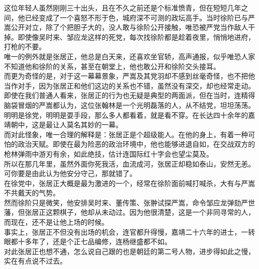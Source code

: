 \begin{multicols}{\theparacolNo}
这位年轻人虽然刚刚三十出头，且在不久之前还是个标准愤青，但在短短几年之间，他已经变成了一个喜怒不形于色，城府深不可测的政坛高手。当时徐阶已与严嵩公开对立，除了个把胆子大的，没人敢与徐阶公开接触，唯恐被严党当作敌人干掉。即使像吴时来、邹应龙这样的死党，每次找徐阶都是趁着夜里，悄悄地进府，打枪的不要。\\

唯一的例外就是张居正，他总是白天来，还喜欢坐官轿，高声通报，似乎唯恐人家不知道他和徐阶的关系，甚至在朝堂上，他也敢公开和徐阶交头接耳。\\

而更为奇怪的是，对于这一幕幕景象，严嵩及其党羽却不感到丝毫奇怪，也不把他当作对手，因为张居正和他们这边的关系也不错，虽然没有深交，却也经常走动。\\

即使在我们普通人看来，张居正的行为也无疑是典型的两面派，但在当时，连精得脑袋冒烟的严嵩都认为，这位张翰林是一个光明磊落的人，从不结党，坦坦荡荡。\\

明明是徐党，明明是耍手段，那么多人都看着，就是看不穿。在长达四十余年的嘉靖朝中，这是最让人莫名其妙的一幕。\\

而对此怪象，唯一合理的解释是：张居正是个超级能人。在他的身上，有着一种可怕的政治天赋。即使在最为险恶的政治环境中，他也能够进退自如，在交战双方的枪林弹雨中游刃有余，如此绝技，估计连国际红十字会也望尘莫及。\\

所以在那几年里，虽然外面你死我活，血流成河，张居正却稳如泰山，安然无恙。\\

可你要是由此认为他安分守己，那就错了。\\

在徐党中，张居正大概是最为激进的一个，经常在徐阶面前喊打喊杀，大有与严嵩不共戴天的气势。\\

然而徐阶只是微笑，他安排吴时来、董传策、张翀试探严嵩，命令邹应龙弹劾严世藩，但张居正这颗棋子，他却从未动过。因为他很清楚，这是一个非同寻常的人，而现在，还不是让他上场的时候。\\

事实上，张居正不但没有出场的机会，连官都升得慢，嘉靖二十六年的进士，一转眼都十多年了，还是个正七品编修，连杨继盛都不如。\\

对此张居正也想不通，怎么说自己跟的也是朝廷的第二号人物，进步得如此之慢，实在有点说不过去。\\


\end{multicols}
